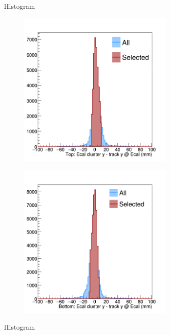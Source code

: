 \begin{figure}[h]
\begin{subfigure}{.5\textwidth}
    \end{subfigure}
    \caption{Histogram}
    \label{fig:track_cluster_delta_x}
\end{figure}
\begin{figure}[h]
    \begin{subfigure}{.5\textwidth}
        \centering
        \includegraphics[width=0.85\textwidth]{images/20160502_pass4_cluster_track_delta_y_top.png}
    \end{subfigure}
    \begin{subfigure}{.5\textwidth}
        \centering
        \includegraphics[width=0.85\textwidth]{images/20160502_pass4_cluster_track_delta_y_bottom.png}
    \end{subfigure}
    \caption{Histogram}
    \label{fig:track_cluster_delta_y}
\end{figure}
